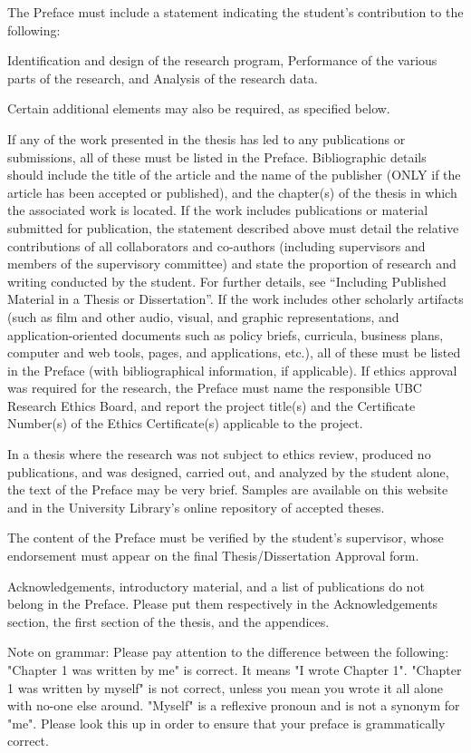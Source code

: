 

The Preface must include a statement indicating the student's contribution to the following:

    Identification and design of the research program,
    Performance of the various parts of the research, and
    Analysis of the research data.

Certain additional elements may also be required, as specified below.

    If any of the work presented in the thesis has led to any publications or submissions, all of these must be listed in the Preface. Bibliographic details should include the title of the article and the name of the publisher (ONLY if the article has been accepted or published), and the chapter(s) of the thesis in which the associated work is located.
    If the work includes publications or material submitted for publication, the statement described above must detail the relative contributions of all collaborators and co-authors (including supervisors and members of the supervisory committee) and state the proportion of research and writing conducted by the student. For further details, see “Including Published Material in a Thesis or Dissertation”.
    If the work includes other scholarly artifacts (such as film and other audio, visual, and graphic representations, and application-oriented documents such as policy briefs, curricula, business plans, computer and web tools, pages, and applications, etc.), all of these must be listed in the Preface (with bibliographical information, if applicable).
    If ethics approval was required for the research, the Preface must name the responsible UBC Research Ethics Board, and report the project title(s) and the Certificate Number(s) of the Ethics Certificate(s) applicable to the project.

In a thesis where the research was not subject to ethics review, produced no publications, and was designed, carried out, and analyzed by the student alone, the text of the Preface may be very brief. Samples are available on this website and in the University Library's online repository of accepted theses.

The content of the Preface must be verified by the student's supervisor, whose endorsement must appear on the final Thesis/Dissertation Approval form.

Acknowledgements, introductory material, and a list of publications do not belong in the Preface. Please put them respectively in the Acknowledgements section, the first section of the thesis, and the appendices.

Note on grammar:
Please pay attention to the difference between the following:
"Chapter 1 was written by me" is correct. It means "I wrote Chapter 1".
"Chapter 1 was written by myself" is not correct, unless you mean you wrote it all alone with no-one else around.
"Myself" is a reflexive pronoun and is not a synonym for "me". Please look this up in order to ensure that your preface is grammatically correct.